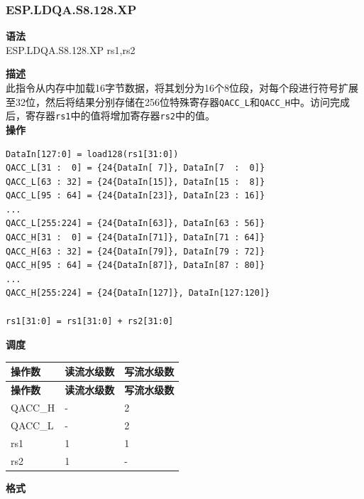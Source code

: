 \newpage

\newpage
\subsubsection{ESP.LDQA.S8.128.XP}\label{instruction:ESPLDQAS8128XP}
\textbf{语法}\\
ESP.LDQA.S8.128.XP rs1,rs2

\textbf{描述}\\
此指令从内存中加载16字节数据，将其划分为16个8位段，对每个段进行符号扩展至32位，然后将结果分别存储在256位特殊寄存器\lstinline{QACC_L}和\lstinline{QACC_H}中。访问完成后，寄存器\lstinline{rs1}中的值将增加寄存器\lstinline{rs2}中的值。\\
\textbf{操作}
\begin{lstlisting}
DataIn[127:0] = load128(rs1[31:0])
QACC_L[31 :  0] = {24{DataIn[ 7]}, DataIn[7  :  0]}
QACC_L[63 : 32] = {24{DataIn[15]}, DataIn[15 :  8]}
QACC_L[95 : 64] = {24{DataIn[23]}, DataIn[23 : 16]}
...
QACC_L[255:224] = {24{DataIn[63]}, DataIn[63 : 56]}
QACC_H[31 :  0] = {24{DataIn[71]}, DataIn[71 : 64]}
QACC_H[63 : 32] = {24{DataIn[79]}, DataIn[79 : 72]}
QACC_H[95 : 64] = {24{DataIn[87]}, DataIn[87 : 80]}
...
QACC_H[255:224] = {24{DataIn[127]}, DataIn[127:120]}

rs1[31:0] = rs1[31:0] + rs2[31:0]
\end{lstlisting}

\textbf{调度}\\
\begin{longtable}[c]{|l|l|l|}
    \hline
    \rowcolor{lightgray}
    \textbf{操作数} & \textbf{读流水级数} & \textbf{写流水级数} \\\hline
    \endfirsthead
    \hline
    \rowcolor{lightgray}
     \textbf{操作数} & \textbf{读流水级数} & \textbf{写流水级数} \\\hline
    \endhead
    \hline
    \endfoot

  QACC\_H & - & 2 \\\hline
    QACC\_L & - & 2 \\\hline
  rs1 & 1 & 1 \\\hline
  rs2 & 1 & -

\end{longtable}

\textbf{格式}\\


